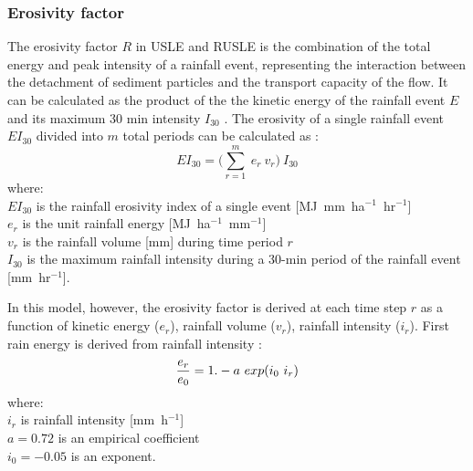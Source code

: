 \documentclass[gmd, manuscript]{copernicus}
\begin{document}
\subsubsection{Erosivity factor}

The erosivity factor $R$ in USLE and RUSLE 
is the combination of the total energy 
and peak intensity of a rainfall event,
representing the interaction 
between the detachment of sediment particles
and the transport capacity of the flow. 
It can be calculated as the product of the 
the kinetic energy of the rainfall event $E$
and its maximum 30 \unit{min} intensity $I_{30}$
\citep{Brown1987,Renard1997}.
%
\noindent The erosivity of a single rainfall event $EI_{30}$
divided into $m$ total periods
can be calculated as
\citep{Panagos2015,Panagos2017}:
%
\begin{equation}
\label{eq:erosivity_index}
EI_{30} = \Bigg(\sum_{r=1}^{m}~ e_r ~ v_r \Bigg) ~ I_{30}
\end{equation}
%
{\small
\noindent
where: \\
\hspace*{0.5em} $EI_{30}$ is the rainfall erosivity index of a single event [\unit{MJ~mm~ha}$^{-1}$~\unit{hr}$^{-1}$]\\
\hspace*{0.5em} $e_r$ is the unit rainfall energy [\unit{MJ~ha}$^{-1}$~\unit{mm}$^{-1}$]\\
\hspace*{0.5em} $v_r$ is the rainfall volume [\unit{mm}] during time period $r$\\
\hspace*{0.5em} $I_{30}$ is the maximum rainfall intensity during a 30-min period of the rainfall event [\unit{mm}~\unit{hr}$^{-1}$].
}

\noindent In this model, however, the erosivity factor
is derived at each time step $r$ as a function of
kinetic energy ($e_r$), rainfall volume ($v_r$), rainfall intensity ($i_r$). 
%
First rain energy is derived from rainfall intensity \citep{Brown1987}: 
%
\begin{equation}
\label{eq:rain_energy}
{e_r \over e_0} = 1.- a ~ exp(i_0 ~ i_r)
\end{equation}
%
{\small
\noindent
where: \\
\noindent
\hspace*{0.5em} $i_r$ is rainfall intensity [\unit{mm~h}$^{-1}$]\\
\hspace*{0.5em} $a=0.72$ is an empirical coefficient\\
\hspace*{0.5em} $i_0=-0.05$ is an exponent.
}
\end{document}
